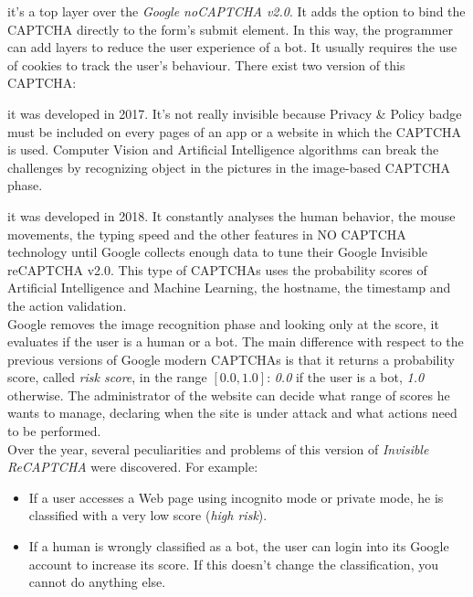 \begin{itemize}
{}
{it's a top layer over the \textit{Google noCAPTCHA v2.0}. It adds the option to bind the CAPTCHA directly to the form’s submit element. In this way, the programmer can add layers to reduce the user experience of a bot\cite{google}. It usually requires the use of cookies to track the user's behaviour. There exist two version of this CAPTCHA:
\begin{itemize}
{it was developed in 2017. It's not really invisible because Privacy \& Policy badge must be included on every pages of an app or a website in which the CAPTCHA is used. Computer Vision and Artificial Intelligence algorithms can break the challenges by recognizing object in the pictures in the image-based CAPTCHA phase.}
{it was developed in 2018. It constantly analyses the human behavior, the mouse movements, the typing speed and the other features in NO CAPTCHA technology until Google collects enough data to tune their Google Invisible reCAPTCHA v2.0. This type of CAPTCHAs uses the probability scores of Artificial Intelligence and Machine Learning, the hostname, the timestamp and the action validation.\\
Google removes the image recognition phase and looking only at the score, it evaluates if the user is a human or a bot. The main difference with respect to the previous versions of Google modern CAPTCHAs is that it returns a probability score, called \textit{risk score}, in the range $[0.0, 1.0]$: \textit{0.0} if the user is a bot, \textit{1.0} otherwise. The administrator of the website can decide what range of scores he wants to manage, declaring when the site is under attack and what actions need to be performed.\\
Over the year, several peculiarities and problems of this version of \textit{Invisible ReCAPTCHA} were discovered. For example:
\begin{itemize}
\item{If a user accesses a Web page using incognito mode or private mode, he is classified with a very low score (\textit{high risk}).}
\item{If a human is wrongly classified as a bot, the user can login into its Google account to increase its score. If this doesn't change the classification, you cannot do anything else.}
\end{itemize}
}
\end{itemize}
}
\end{itemize}

